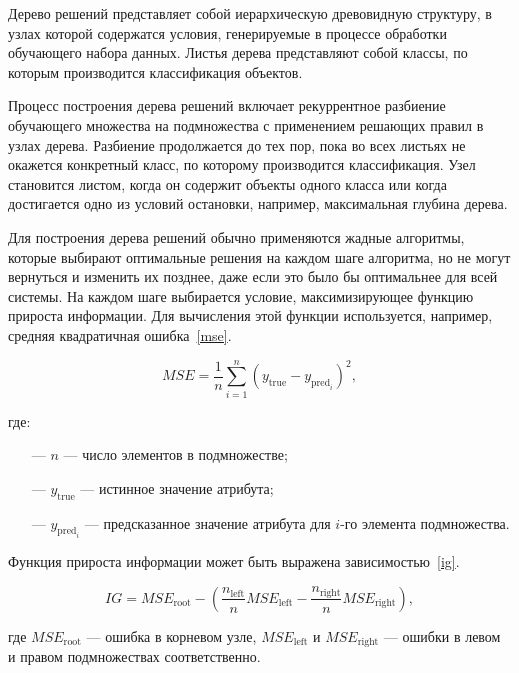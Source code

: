 Дерево решений представляет собой иерархическую древовидную структуру, в узлах которой содержатся условия, генерируемые в процессе обработки обучающего набора данных. Листья дерева представляют собой классы, по которым производится классификация объектов.

Процесс построения дерева решений включает рекуррентное разбиение обучающего множества на подмножества с применением решающих правил в узлах дерева. Разбиение продолжается до тех пор, пока во всех листьях не окажется конкретный класс, по которому производится классификация. Узел становится листом, когда он содержит объекты одного класса или когда достигается одно из условий остановки, например, максимальная глубина дерева.

Для построения дерева решений обычно применяются жадные алгоритмы, которые выбирают оптимальные решения на каждом шаге алгоритма, но не могут вернуться и изменить их позднее, даже если это было бы оптимальнее для всей системы. На каждом шаге выбирается условие, максимизирующее функцию прироста информации. Для вычисления этой функции используется, например, средняя квадратичная ошибка~\ref{mse}.

\begin{equation}
    \label{mse}
    MSE = \frac{1}{n} \sum_{i=1}^{n} (y_{\text{true}} - y_{\text{pred}_i})^2,
\end{equation}

где:

\begin{itemize}
    \item[---] $ n $ — число элементов в подмножестве;
    \item[---] $ y_{\text{true}} $ — истинное значение атрибута;
    \item[---] $ y_{\text{pred}_i} $ — предсказанное значение атрибута для $ i $-го элемента подмножества.
\end{itemize}

\clearpage

Функция прироста информации может быть выражена зависимостью~\ref{ig}.

\begin{equation}
    \label{ig}
    IG = MSE_{\text{root}} - \left( \frac{n_{\text{left}}}{n} MSE_{\text{left}} - \frac{n_{\text{right}}}{n} MSE_{\text{right}} \right),
\end{equation}

где $ MSE_{\text{root}} $ — ошибка в корневом узле, $ MSE_{\text{left}} $ и $ MSE_{\text{right}} $ — ошибки в левом и правом подмножествах соответственно.


